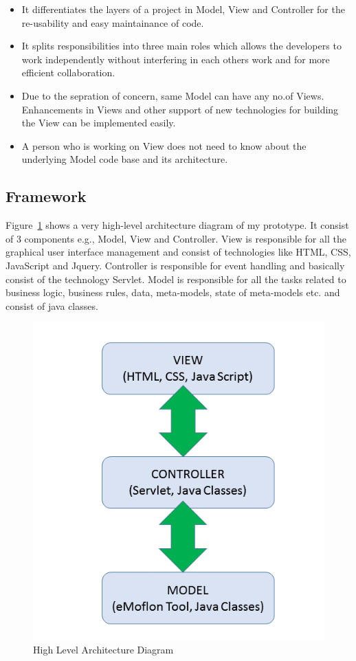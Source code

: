 \begin{itemize}
	\item {It differentiates the layers of a project in Model, View and Controller for the re-usability and easy maintainance of code.}
	\item {It splits responsibilities into three main roles which allows the developers to work independently without interfering in each others work and for more efficient collaboration.}
	\item {Due to the sepration of concern, same Model can have any no.of Views. Enhancements in Views and other support of new technologies for building the View can be implemented easily.}
	\item {A person who is working on View does not need to know about the underlying Model code base and its architecture.}
\end{itemize}
\subsection{Framework}\label{subsec:framework}
Figure~\ref{fig:Architecture_Diagram} shows a very high-level architecture diagram of my prototype. It consist of 3 components e.g., Model, View and Controller. View is responsible for all the graphical user interface management and consist of technologies like HTML, CSS, JavaScript and Jquery. Controller is responsible for event handling and basically consist of the technology Servlet. Model is responsible for all the tasks related to business logic, business rules, data, meta-models, state of meta-models etc. and consist of java classes.
\begin{figure}
	\includegraphics[width=1\textwidth]{figures/Highlevel_Arch}
	\caption{High Level Architecture Diagram}
	\label{fig:Architecture_Diagram}
\end{figure}
\clearpage
